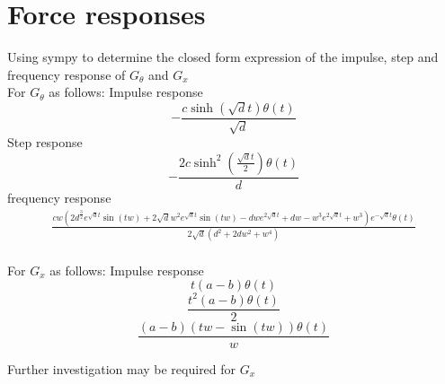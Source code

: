 \section{Force responses}%
\label{closedloopy}

Using sympy to determine the closed form expression of the impulse, step and frequency response of $G_{\theta}$ and $G_{x}$
\\
For $G_{\theta}$ as follows: Impulse response
\[- \frac{c \sinh{\left(\sqrt{d} t \right)} \theta\left(t\right)}{\sqrt{d}} \]
Step response
\[- \frac{2 c \sinh^{2}{\left(\frac{\sqrt{d} t}{2} \right)} \theta\left(t\right)}{d}\]
frequency response
\begin{multline}
    \frac{c w \left(2 d^{\frac{3}{2}} e^{\sqrt{d} t} \sin{\left(t w \right)} + 2 \sqrt{d} w^{2} e^{\sqrt{d} t} \sin{\left(t w \right)} - d w e^{2 \sqrt{d} t} + d w - w^{3} e^{2 \sqrt{d} t} + w^{3}\right) e^{- \sqrt{d} t} \theta\left(t\right)}{2 \sqrt{d} \left(d^{2} + 2 d w^{2} + w^{4}\right)}
\end{multline}
\\

For $G_{x}$ as follows: Impulse response
\[t \left(a - b\right) \theta\left(t\right)\]
\[\frac{t^{2} \left(a - b\right) \theta\left(t\right)}{2}\]
\[\frac{\left(a - b\right) \left(t w - \sin{\left(t w \right)}\right) \theta\left(t\right)}{w}\]

Further investigation may be required for $G_{x}$